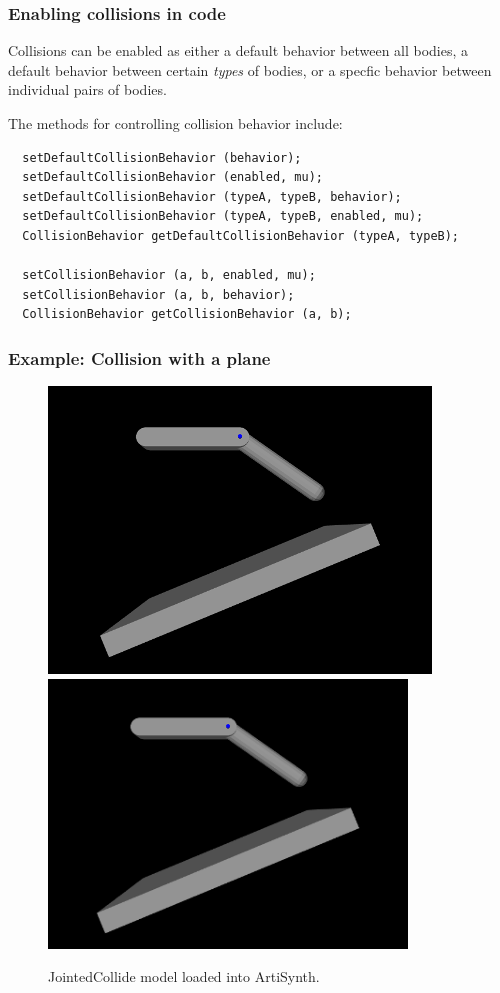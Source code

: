 \subsubsection{Enabling collisions in code}

Collisions can be enabled as either a default behavior between all
bodies, a default behavior between certain {\it types} of
bodies, or a specfic behavior between individual pairs of bodies.

The methods for controlling collision behavior include:
%
\begin{lstlisting}
  setDefaultCollisionBehavior (behavior);
  setDefaultCollisionBehavior (enabled, mu);
  setDefaultCollisionBehavior (typeA, typeB, behavior);
  setDefaultCollisionBehavior (typeA, typeB, enabled, mu);
  CollisionBehavior getDefaultCollisionBehavior (typeA, typeB);

  setCollisionBehavior (a, b, enabled, mu);
  setCollisionBehavior (a, b, behavior);
  CollisionBehavior getCollisionBehavior (a, b);
\end{lstlisting}
%

\subsubsection{Example: Collision with a plane}

\begin{figure}[h]
\begin{center}
\iflatexml
 \includegraphics[]{images/JointedCollide}
\else
 \includegraphics[width=3.75in]{images/JointedCollide}
\fi
\end{center}
\caption{JointedCollide model loaded into ArtiSynth.}
\label{JointedCollide:fig}
\end{figure}


